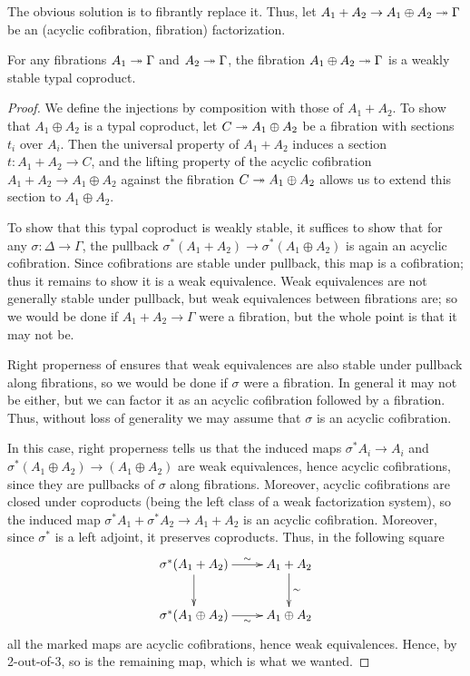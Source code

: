 \documentclass{amsart}
\begin{document}
The obvious solution is to fibrantly replace it.
Thus, let $A_1 + A_2 \to A_1\oplus A_2 \twoheadrightarrow \Gamma$ be an (acyclic cofibration, fibration) factorization.

\begin{thm}\label{thm:coproduct}
  For any fibrations $A_1 \twoheadrightarrow \Gamma$ and $A_2\twoheadrightarrow\Gamma$, %
  the fibration $A_1\oplus A_2 \twoheadrightarrow\Gamma$ is a weakly stable typal coproduct.
\end{thm}
\begin{proof}
  We define the injections by composition with those of $A_1+A_2$.
  To show that $A_1\oplus A_2$ is a typal coproduct, let $C\twoheadrightarrow A_1\oplus A_2$ be a fibration with sections $t_i$ over $A_i$.
  Then the universal property of $A_1+A_2$ induces a section $t : A_1+A_2 \to C$, and the lifting property of the acyclic cofibration $A_1+A_2 \to A_1\oplus A_2$ against the fibration $C\twoheadrightarrow A_1\oplus A_2$ allows us to extend this section to $A_1\oplus A_2$.

  To show that this typal coproduct is weakly stable, it suffices to show that for any $\sigma :\Delta\to\Gamma$, the pullback $\sigma^*(A_1+A_2) \to \sigma^*(A_1\oplus A_2)$ is again an acyclic cofibration.
  Since cofibrations are stable under pullback, this map is a cofibration; thus it remains to show it is a weak equivalence.
  Weak equivalences are not generally stable under pullback, but weak equivalences between fibrations are; so we would be done if $A_1+A_2 \to \Gamma$ were a fibration, but the whole point is that it may not be.

  Right properness of \sM ensures that weak equivalences are also stable under pullback along fibrations, so we would be done if $\sigma$ were a fibration.
  In general it may not be either, but we can factor it as an acyclic cofibration followed by a fibration.
  Thus, without loss of generality we may assume that $\sigma$ is an acyclic cofibration.

  In this case, right properness tells us that the induced maps $\sigma^*A_i \to A_i$ and $\sigma^*(A_1\oplus A_2) \to (A_1\oplus A_2)$ are weak equivalences, hence acyclic cofibrations, since they are pullbacks of $\sigma$ along fibrations.
  Moreover, acyclic cofibrations are closed under coproducts (being the left class of a weak factorization system), so the induced map $\sigma^*A_1 +\sigma^*A_2 \to A_1+A_2$ is an acyclic cofibration.
  Moreover, since $\sigma^*$ is a left adjoint, it preserves coproducts.
  Thus, in the following square
  \[ \xymatrix{ \sigma^*(A_1+A_2) \ar[r]^-\sim \ar[d] & A_1+A_2 \ar[d]^\sim \\ \sigma^*(A_1\oplus A_2) \ar[r]_-\sim & A_1\oplus A_2} \]
  all the marked maps are acyclic cofibrations, hence weak equivalences.
  Hence, by 2-out-of-3, so is the remaining map, which is what we wanted.
\end{proof}
\end{document}
